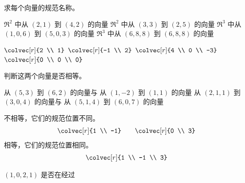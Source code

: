 \begin{exercises}
  \recommended \item
    求每个向量的规范名称。
    \begin{exparts}
      \partsitem \( \Re^2 \) 中从 \( (2,1) \) 到 \( (4,2) \) 的向量
      \partsitem \( \Re^2 \) 中从 \( (3,3) \) 到 \( (2,5) \) 的向量
      \partsitem \( \Re^3 \) 中从 \( (1,0,6) \) 到 \( (5,0,3) \) 的向量
      \partsitem \( \Re^3 \) 中从 \( (6,8,8) \) 到 \( (6,8,8) \) 的向量
    \end{exparts}
    \begin{answer}
      \begin{exparts*}
        \partsitem \( \colvec[r]{2 \\ 1}  \)
        \partsitem \( \colvec[r]{-1 \\ 2}  \)
        \partsitem \( \colvec[r]{4 \\ 0 \\ -3}  \)
        \partsitem \( \colvec[r]{0 \\ 0 \\ 0}  \)
      \end{exparts*}  
     \end{answer}
  \recommended \item 
    判断这两个向量是否相等。
    \begin{exparts}
      \partsitem 从 \( (5,3) \) 到 \( (6,2) \) 的向量与
        从 \( (1,-2) \) 到 \( (1,1) \) 的向量
      \partsitem 从 \( (2,1,1) \) 到 \( (3,0,4) \) 的向量与
        从 \( (5,1,4) \) 到 \( (6,0,7) \) 的向量
    \end{exparts}
    \begin{answer}
      \begin{exparts}
        \partsitem 不相等，它们的规范位置不同。
          \begin{equation*}
            \colvec[r]{1 \\ -1}
            \qquad
            \colvec[r]{0 \\ 3}
          \end{equation*}
        \partsitem 相等，它们的规范位置相同。
          \begin{equation*}
            \colvec[r]{1 \\ -1 \\ 3}
          \end{equation*}
      \end{exparts}  
     \end{answer}
  \recommended \item
    \( (1,0,2,1) \) 是否在经过

\end{exercises}
